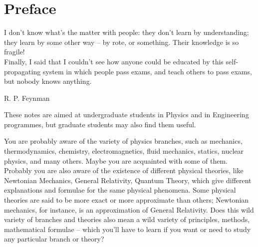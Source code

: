 \documentclass[a4paper,12pt,%
onecolumn,oneside,%
british%
]{memoir}
\newcommand{\addchap}[1]{\chapter*[#1]{#1}\addcontentsline{toc}{chapter}{#1}}
\renewcommand*{\|}[1][]{\nonscript\:#1\vert\nonscript\:\mathopen{}}
\begin{document}
\setlength{\epigraphwidth}{0.67\linewidth}
\epigraphfontsize{\footnotesize}
\setlength{\epigraphrule}{0pt}




\cleartooddpage
{}
\setlength{\cftsectionnumwidth}{2.75em}
\tableofcontents*
\label{sec:toc}

\setcounter{chapter}{-1}


\printpagenotes*
\cleartooddpage
\addchap{Preface}
\label{cha:preface}

\epigraph{I don't know what's the matter with people: they don't learn by understanding; they learn by some other way -- by rote, or something. Their knowledge is so fragile!\\[2\jot]
  Finally, I said that I couldn't see how anyone could be educated by this self-propagating system in which people pass exams, and teach others to pass exams, but nobody knows anything.}{R. P. Feynman \cites*{feynman1985_r1989}}

These notes are aimed at undergraduate students in Physics and in Engineering programmes, but graduate students may also find them useful.

You are probably aware of the variety of physics branches, such as mechanics, thermodynamics, chemistry, electromagnetics, fluid mechanics, statics, nuclear physics, and many others. Maybe you are acquainted with some of them. Probably you are also aware of the existence of different physical theories, like Newtonian Mechanics, General Relativity, Quantum Theory, which give different explanations and formulae for the same physical phenomena. Some physical theories are said to be more exact or more approximate than others; Newtonian mechanics, for instance, is an approximation of General Relativity. Does this wild variety of branches and theories also mean a wild variety of principles, methods, mathematical formulae -- which you'll have to learn if you want or need to study any particular branch or theory?
\end{document}
